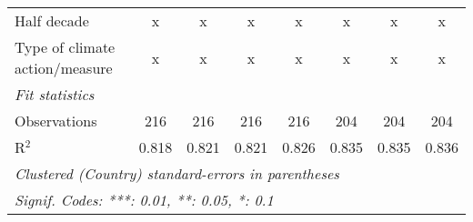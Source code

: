 \begin{tabular}{lccccccc}
   Half decade                                                                                           & x            & x           & x            & x           & x           & x           & x\\  
   Type of climate action/measure                                                                        & x            & x           & x            & x           & x           & x           & x\\  
   \midrule \emph{Fit statistics}\\
   Observations                                                                                          & 216          & 216         & 216          & 216         & 204         & 204         & 204\\  
   R$^2$                                                                                                 & 0.818        & 0.821       & 0.821        & 0.826       & 0.835       & 0.835       & 0.836\\  
   \midrule
   \multicolumn{8}{l}{\emph{Clustered (Country) standard-errors in parentheses}}\\
   \multicolumn{8}{l}{\emph{Signif. Codes: ***: 0.01, **: 0.05, *: 0.1}}\\
\end{tabular}
\par\endgroup


